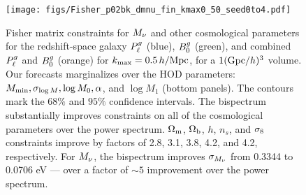 \begin{figure}
    \begin{center}
        \texttt{[image: figs/Fisher\_p02bk\_dmnu\_fin\_kmax0\_50\_seed0to4.pdf]}
        \caption{Fisher matrix constraints for $M_\nu$ and other cosmological
        parameters for the redshift-space galaxy $P^g_{\ell}$ (blue), $B^g_0$
        (green), and combined $P^g_{\ell}$ and $B^g_0$ (orange) for $k_{\rm max} =
        0.5\,h/\mathrm{Mpc}$, for a $1 ({\rm Gpc}/h)^3$ volume. Our forecasts marginalizes over the \cite{zheng2007}
        HOD parameters: $M_{\rm min}, \sigma_{\log M}, \log M_0, \alpha$, 
        and $\log M_1$ (bottom panels). The contours mark the $68\%$ and $95\%$
        confidence intervals. The bispectrum substantially improves
        constraints on all of the cosmological parameters over the power
        spectrum. $\Omega_{\rm m}$, $\Omega_{\rm b}$, $h$, $n_s$, and $\sigma_8$ constraints improve by factors
        of 2.8, 3.1, 3.8, 4.2, and 4.2, respectively. For $M_\nu$, the
        bispectrum improves $\sigma_{M_\nu}$ from 0.3344 to 0.0706 eV --- over
        a factor of ${\sim}5$ improvement over the power spectrum.
        }
        \label{fig:forecast}
    \end{center}
\end{figure}

